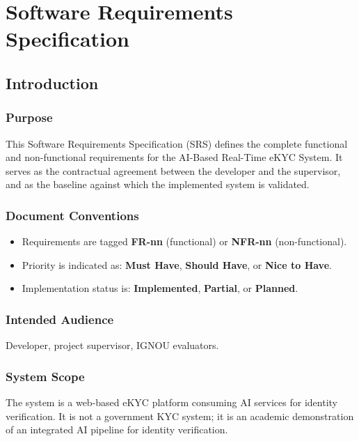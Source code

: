 \documentclass[12pt,a4paper]{report}
\begin{document}
\chapter{Software Requirements Specification}

\section{Introduction}

\subsection{Purpose}
This Software Requirements Specification (SRS) defines the complete functional and non-functional requirements for the AI-Based Real-Time eKYC System. It serves as the contractual agreement between the developer and the supervisor, and as the baseline against which the implemented system is validated.

\subsection{Document Conventions}
\begin{itemize}
    \item Requirements are tagged \textbf{FR-nn} (functional) or \textbf{NFR-nn} (non-functional).
    \item Priority is indicated as: \textbf{Must Have}, \textbf{Should Have}, or \textbf{Nice to Have}.
    \item Implementation status is: \textbf{Implemented}, \textbf{Partial}, or \textbf{Planned}.
\end{itemize}

\subsection{Intended Audience}
Developer, project supervisor, IGNOU evaluators.

\subsection{System Scope}
The system is a web-based eKYC platform consuming AI services for identity verification. It is not a government KYC system; it is an academic demonstration of an integrated AI pipeline for identity verification.
\end{document}
